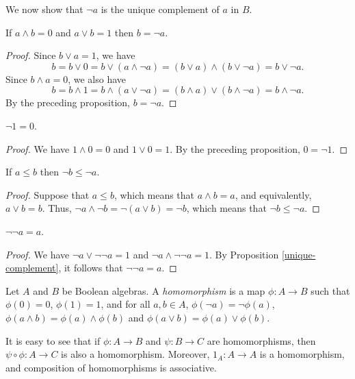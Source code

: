 We now show that $\neg a$ is the unique complement of $a$ in $B$.

\begin{prop} If $a\wedge b=0$ and $a\vee b=1$ then $b=\neg
  a$. \label{unique-complement} \end{prop}

\begin{proof} Since $b\vee a=1$, we have
\[ 
b = b\vee 0 = b\vee (a\wedge \neg a) = (b\vee a)\wedge (b\vee \neg a)
= b\vee \neg a .\] Since $b\wedge a=0$, we also have 
\[ b=b\wedge 1=b\wedge (a\vee \neg a) = (b\wedge a)\vee (b\wedge \neg
a)=b\wedge \neg a .\]
By the preceding proposition, $b=\neg a$. 
\end{proof}

\begin{prop} $\neg 1=0$. \end{prop}

\begin{proof} We have $1\wedge 0=0$ and $1\vee 0=1$.  By the preceding
  proposition, $0=\neg 1$. \end{proof}


\begin{prop} If $a\leq b$ then $\neg b\leq \neg a$. \end{prop}

\begin{proof} Suppose that $a\leq b$, which means that $a\wedge b=a$,
  and equivalently, $a\vee b=b$.  Thus, $\neg a\wedge \neg b =\neg
  (a\vee b)=\neg b$, which means that $\neg b\leq\neg a$. \end{proof}

\begin{prop} $\neg \neg a=a$.  \end{prop}

\begin{proof} We have $\neg a\vee \neg\neg a=1$ and $\neg a\wedge \neg
  \neg a=1$.  By Proposition \ref{unique-complement}, it follows that
  $\neg\neg a=a$. \end{proof}


\begin{defn} Let $A$ and $B$ be Boolean algebras.  A
  \emph{homomorphism} is a map $\phi :A\to B$ such that $\phi (0)=0$,
  $\phi (1)=1$, and for all $a,b\in A$, $\phi (\neg a)=\neg \phi (a)$,
  $\phi (a\wedge b)=\phi (a)\wedge \phi (b)$ and $\phi (a\vee b)=\phi
  (a)\vee \phi (b)$. \end{defn}

It is easy to see that if $\phi :A\to B$ and $\psi :B\to C$ are
homomorphisms, then $\psi\circ \phi :A\to C$ is also a homomorphism.
Moreover, $1_A:A\to A$ is a homomorphism, and composition of
homomorphisms is associative.  

